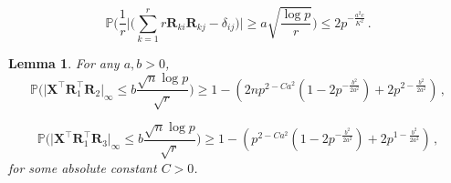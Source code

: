 \documentclass[10pt,a4paper]{amsart}
\newtheorem{lemma}{Lemma}
\newcommand{\Prob}{\mathbb{P}}
\newcommand{\bR}{\boldsymbol{R}}
\newcommand{\bX}{\boldsymbol{X}}
\begin{document}
\begin{equation}\label{eq:boundR3}
    \Prob\bigg(\frac{1}{r}\bigg|\bigg(\sum_{k=1}^r r\bR_{ki}\bR_{kj}-\delta_{ij}\bigg)\bigg|\geq a\sqrt{\frac{\log p}{r}}\bigg)\leq 2p^{-\frac{a^2c}{K^2}}\,.
\end{equation}

\begin{lemma}\label{lemma:boundXR}
    For any $a,b>0$, 
    \begin{equation}\label{eq:boundXR1}
        \Prob\bigg(\big|\bX^\top \bR_1^\top \bR_2\big|_\infty \leq b\frac{\sqrt{n}\log p}{\sqrt{r}} \bigg)\geq 1-\left(2np^{2-Ca^2}(1-2p^{-\frac{b^2}{2a^2}})+2p^{2-\frac{b^2}{2a^2}}\right)\,,
    \end{equation}
    
    \begin{equation}\label{eq:boundXR2}
        \Prob\bigg(\big|\bX^\top \bR_1^\top \bR_3\big|_\infty \leq b\frac{\sqrt{n}\log p}{\sqrt{r}} \bigg)\geq 1-\left(p^{2-Ca^2}(1-2p^{-\frac{b^2}{2a^2}})+2p^{1-\frac{b^2}{2a^2}}\right)\,,
    \end{equation}
    for some absolute constant $C>0$.
\end{lemma}
\end{document}
